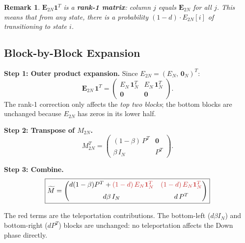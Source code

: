 \documentclass[12pt,a4paper]{article}
\theoremstyle{definition}
\theoremstyle{plain}
\newtheorem{remark}{Remark}[section]
\begin{document}
\begin{remark}
  $\bm{E}_{2N}\bm{1}^T$ is a \textbf{rank-1 matrix}: column $j$ equals $\bm{E}_{2N}$
  for all $j$. This means that from \emph{any} state, there is a probability
  $(1-d)\cdot E_{2N}[i]$ of transitioning to state $i$.
\end{remark}

\subsection{Block-by-Block Expansion}

\noindent\textbf{Step 1: Outer product expansion.}
Since $E_{2N} = (E_N,\,\bm{0}_N)^T$:
\begin{equation}
  \bm{E}_{2N}\,\bm{1}^T
  = \begin{pmatrix} E_N\,\bm{1}_N^T & E_N\,\bm{1}_N^T \\[4pt]
    \bm{0} & \bm{0} \end{pmatrix}.
  \label{eq:outerblock}
\end{equation}
The rank-1 correction only affects the \emph{top two blocks}; the bottom blocks are
unchanged because $E_{2N}$ has zeros in its lower half.

\noindent\textbf{Step 2: Transpose of $M_{2N}$.}
\begin{equation}
  M_{2N}^T =
  \begin{pmatrix}
    (1-\beta)\,P^T & \bm{0} \\[4pt]
    \beta\,I_N & P^T
  \end{pmatrix}.
  \label{eq:M2Ntranspose}
\end{equation}

\noindent\textbf{Step 3: Combine.}
\begin{equation}
  \boxed{
  \widetilde{M} =
  \begin{pmatrix}
    d(1-\beta)P^T + {\color{accent}(1-d)\,E_N\bm{1}_N^T}
      & {\color{accent}(1-d)\,E_N\bm{1}_N^T} \\[6pt]
    d\beta\,I_N & d\,P^T
  \end{pmatrix}
  }
  \label{eq:googleblocks}
\end{equation}

The {\color{accent}red} terms are the teleportation contributions. The bottom-left
($d\beta I_N$) and bottom-right ($dP^T$) blocks are unchanged: no teleportation affects
the Down phase directly.
\end{document}
